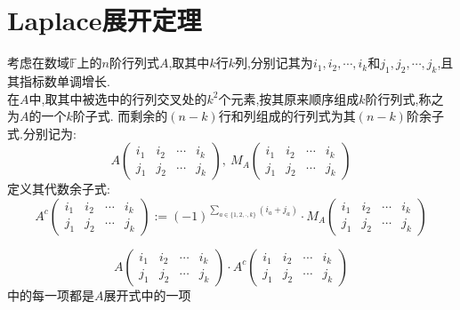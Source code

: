 \documentclass[UTF8,a4paper,notitlepage]{book}
\begin{document}
        \section{Laplace展开定理}
        考虑在数域$\mathbb{F}$上的$n$阶行列式$A$,取其中$k$行$k$列,分别记其为$i_1,i_2,\cdots,i_k$和$j_1,j_2,\cdots,j_k$,且其指标数单调增长.
        \\在$A$中,取其中被选中的行列交叉处的$k^2$个元素,按其原来顺序组成$k$阶行列式,称之为$A$的一个$k$阶子式.
          而剩余的$(n-k)$行和列组成的行列式为其$(n-k)$阶余子式.分别记为:
          $$A\begin{pmatrix}i_1 & i_2 & \cdots & i_k \\ j_1 & j_2 & \cdots & j_k\end{pmatrix},~
          M_A \begin{pmatrix}i_1 & i_2 & \cdots & i_k \\ j_1 & j_2 & \cdots & j_k\end{pmatrix}$$
          定义其代数余子式:
        $$A^c \begin{pmatrix}i_1 & i_2 & \cdots & i_k \\ j_1 & j_2 & \cdots & j_k\end{pmatrix}:= (-1)^{\sum_{a\in \{1,2,\cdot,k\}} (i_a+j_a)} \cdot M_A \begin{pmatrix}i_1 & i_2 & \cdots & i_k \\ j_1 & j_2 & \cdots & j_k\end{pmatrix} $$
        \begin{lemma}
            $$A\begin{pmatrix}i_1 & i_2 & \cdots & i_k \\ j_1 & j_2 & \cdots & j_k\end{pmatrix}\cdot A^c \begin{pmatrix}i_1 & i_2 & \cdots & i_k \\ j_1 & j_2 & \cdots & j_k\end{pmatrix}$$
            中的每一项都是$A$展开式中的一项
        \end{lemma}
\end{document}
